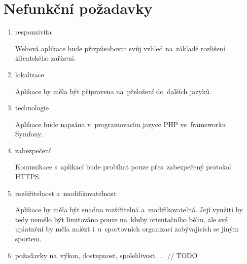 \section{Nefunkční požadavky}
\begin{enumerate}
	\item responzivita

Webová aplikace bude přizpůsobovat svůj vzhled na~základě rozlišení klientského zařízení.

	\item lokalizace

Aplikace by měla být připravena na~přeložení do~dalších jazyků.

	\item technologie

Aplikace bude napsána v~programovacím jazyce PHP ve~frameworku Symfony.

	\item zabezpečení

Komunikace s~aplikací bude probíhat pouze přes~zabezpečený protokol HTTPS.

	\item rozšiřitelnost a~modifikovatelnost

Aplikace by měla být snadno rozšiřitelná a~modifikovatelná. Její využití by tedy nemělo být limitováno pouze na~kluby orientačního běhu, ale své uplatnění by měla nalézt i~u~sportovních organizací zabývajících se jiným sportem.

	\item požadavky na~výkon, dostupnost, spolehlivost, ... // TODO
\end{enumerate}
